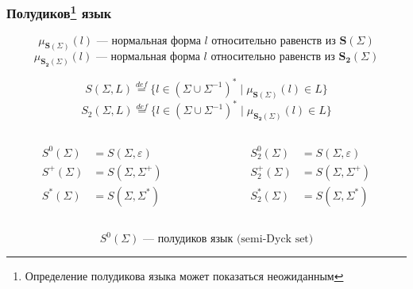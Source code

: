\documentclass{beamer}
\begin{document}
\begin{frame}[fragile]
  \frametitle{Полудиков\footnote{Определение полудикова языка может показаться неожиданным} язык}
\[
  \mu_{\bm{S}(\Sigma)}(l) \text{ --- нормальная форма } l \text{ относительно равенств из } \bm{S}(\Sigma)
\]
\[
  \mu_{\bm{S_2}(\Sigma)}(l) \text{ --- нормальная форма } l \text{ относительно равенств из } \bm{S_2}(\Sigma)
\]

\[
  S(\Sigma, L) \stackrel{def}{=} \{ l \in (\Sigma \cup \Sigma^{-1})^* \mid \mu_{\bm{S}(\Sigma)}(l) \in L\}
\]
\[
  S_2(\Sigma, L) \stackrel{def}{=} \{ l \in (\Sigma \cup \Sigma^{-1})^* \mid \mu_{\bm{S_2}(\Sigma)}(l) \in L\}
\]


\begin{columns}
  \begin{column}{0.5\textwidth}
    \begin{align*}
      S^0(\Sigma) &= S(\Sigma, {\varepsilon}) \\
      S^+(\Sigma) &= S(\Sigma, \Sigma^+) \\
      S^*(\Sigma) &= S(\Sigma, \Sigma^*)
    \end{align*}
  \end{column}
  \begin{column}{0.5\textwidth}
    \begin{align*}
      S^0_2(\Sigma) &= S(\Sigma, {\varepsilon}) \\
      S^+_2(\Sigma) &= S(\Sigma, \Sigma^+) \\
      S^*_2(\Sigma) &= S(\Sigma, \Sigma^*)
    \end{align*}
  \end{column}
  \end{columns}

\bigskip

  \[
    S^0(\Sigma) \text{ --- полудиков язык (semi-Dyck set)}
  \]

  \bigskip

\end{frame}
\end{document}

